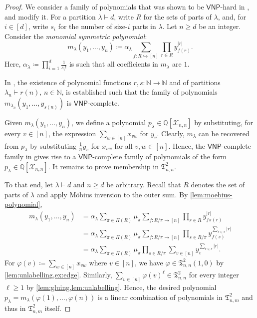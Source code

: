 \documentclass[10pt,a4paper]{article}
\theoremstyle{definition}
\theoremstyle{plain}
\theoremstyle{remark}
\renewcommand{\phi}{\varphi}
\newcommand{\VNP}{\mathsf{VNP}}
\begin{document}
	\hardPolynomialsInT*
	
	
	
	\begin{proof}
		We consider a family of polynomials that was shown to be $\VNP$-hard in \cite[Theorem~1]{curticapean_et_al2022}, and modify it. 
		For a partition $\lambda \vdash d$, write $R$ for the sets of parts of $\lambda$,
		and, for $i \in [d]$, write $s_i$ for the number of size-$i$ parts in $\lambda$.
		Let $n \geq d$ be an integer. 
		Consider the \emph{monomial symmetric polynomial}:
		\[
		m_\lambda(y_1, \dots, y_n) \coloneqq \alpha_\lambda \sum_{f \colon R \hookrightarrow [n]} \prod_{r \in R} y_{f(r)}^{|r|}.
		\]	
		Here, $\alpha_\lambda \coloneqq \prod_{i=1}^d \frac{1}{s_i!}$ is such that all coefficients in $m_\lambda$ are $1$.
		
		In \cite[Theorem~1]{curticapean_et_al2022}, the existence of polynomial functions $r,s \colon \mathbb{N} \to \mathbb{N}$ and of partitions $\lambda_n \vdash r(n)$, $n \in \mathbb{N}$,
		is established such that the family of polynomials $m_{\lambda_n}(y_1, \dots, y_{s(n)})$ is $\VNP$-complete.
		
		Given $m_\lambda(y_1, \dots, y_n)$, we define a polynomial $p_\lambda \in \mathbb{Q}[\mathcal{X}_{n,n}]$ by substituting, for every $v \in [n]$, the expression $\sum_{w \in [n]} x_{vw}$ for $y_v$.
		Clearly, $m_\lambda$ can be recovered from $p_\lambda$ by substituting $\frac1n y_v$ for $x_{vw}$ for all $v, w \in [n]$.
		Hence, the $\VNP$-complete family in \cite[Theorem~1]{curticapean_et_al2022} gives rise to a $\VNP$-complete family of polynomials of the form $p_\lambda \in \mathbb{Q}[\mathcal{X}_{n,n}]$.
		It remains to prove membership in $\mathfrak{T}^2_{n,n}$.
		
		To that end, let $\lambda \vdash d$ and $n \geq d$ be arbitrary.
		Recall that $R$ denotes the set of parts of $\lambda$
		and apply Möbius inversion to the outer sum.
		By \cref{lem:moebius-polynomial},
		\begin{align*}
			m_\lambda(y_1, \dots, y_n) &= \alpha_\lambda \sum_{\pi \in \Pi(R)} \mu_\pi \sum_{f \colon R/\pi \to [n]} \prod_{r \in R} y_{f\pi(r)}^{|r|} \\
			&= \alpha_\lambda \sum_{\pi \in \Pi(R)} \mu_\pi \sum_{f \colon R/\pi \to [n]} \prod_{s \in R/\pi} y_{f(s)}^{\sum_{r \in s}|r|} \\
			&= \alpha_\lambda  \sum_{\pi \in \Pi(R)} \mu_\pi \prod_{s \in R/\pi} \sum_{v \in [n]} y_v^{\sum_{r \in s}|r|}.
		\end{align*}
		For $\phi(v) \coloneqq \sum_{w \in [n]} x_{vw}$ where $v \in [n]$,
		we have $\phi \in \mathfrak{T}^2_{n,n}(1,0)$ by \cref{lem:unlabelling,ex:edge}.
		Similarly, $\sum_{v \in [n]} \phi(v)^{\ell} \in \mathfrak{T}^2_{n,n}$ for every  integer $\ell \geq 1$ by  \cref{lem:gluing,lem:unlabelling}.
		Hence, the desired polynomial $p_{\lambda} = m_{\lambda}(\phi(1), \dots, \phi(n))$ is a linear combination of polynomials in $\mathfrak{T}^2_{n,m}$ and thus in $\mathfrak{T}^2_{n,m}$ itself.
	\end{proof}	
	
\end{document}
